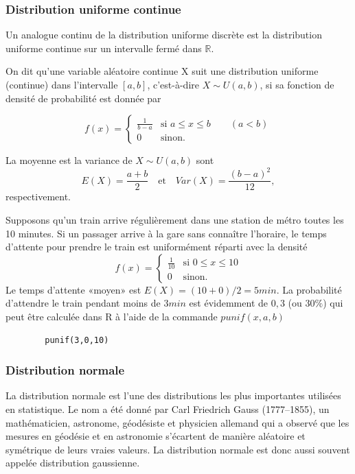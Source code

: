 {\subsubsection{Distribution uniforme continue}

Un analogue continu de la distribution uniforme discrète est la distribution uniforme continue sur un intervalle
fermé dans $\mathbb{R} $.

\theoremstyle{definition}
\begin{definition}
    On dit qu'une variable aléatoire continue X suit une distribution uniforme (continue) dans l'intervalle $[a, b]$,
    c'est-à-dire $X \sim U(a,b)$,  si sa fonction de densité de probabilité est donnée par

    $$f(x) = \begin{cases} \frac{1}{b-a} & \mbox{si   } a\leq x\leq b\quad\mathrm{   }\quad (a<b)\\
                            0 & \mbox{sinon. }\end{cases}$$

\end{definition}
La moyenne est la variance de $X\sim U(a,b)$ sont
$$E(X)=\frac{a+b}{2} \quad\mathrm{ et }\quad Var(X)=\frac{(b-a)^2}{12},$$ respectivement.

\begin{example}
    Supposons qu'un train arrive régulièrement dans une station de métro toutes les 10 minutes. Si un passager arrive
    à la gare sans connaître l'horaire, le temps d'attente pour prendre le train est uniformément réparti avec la
    densité
    $$f(x) = \begin{cases} \frac{1}{10} & \mbox{si   } 0\leq x\leq 10\\
    0 & \mbox{sinon. }\end{cases}$$
    Le temps d'attente «moyen» est $E(X) = (10 + 0)/2 = 5 min$. La probabilité d'attendre le train pendant moins
    de $3min$ est évidemment de $0,3$ (ou $30\%$) qui peut être calculée dans R à l'aide de la
    commande $punif(x, a, b)$
    \begin{verbatim}
        punif(3,0,10)
    \end{verbatim}
\end{example}

\subsubsection{Distribution normale}
La distribution normale est l'une des distributions les plus importantes utilisées en statistique. Le nom a été donné
par Carl Friedrich Gauss (1777–1855), un mathématicien, astronome, géodésiste et physicien allemand qui a observé que
les mesures en géodésie et en astronomie s'écartent de manière aléatoire et symétrique de leurs vraies valeurs.
La distribution normale est donc aussi souvent appelée distribution gaussienne.

}
